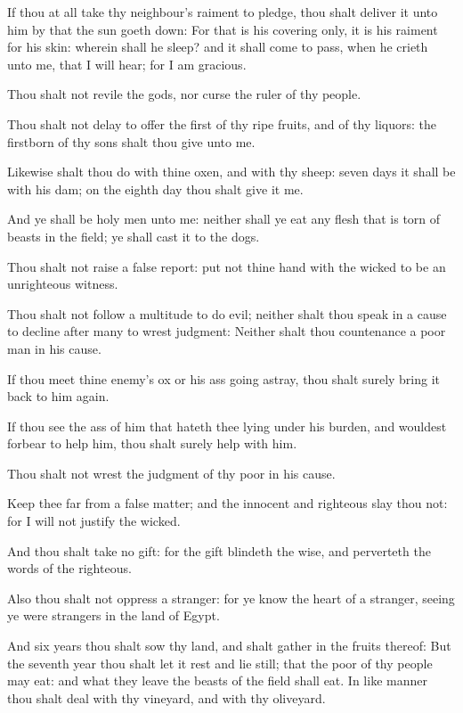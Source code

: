 \Verse If thou at all take thy neighbour's raiment to pledge, thou shalt deliver it unto him by that the sun goeth down: \Verse For that is his covering only, it is his raiment for his skin: wherein shall he sleep? and it shall come to pass, when he crieth unto me, that I will hear; for I am gracious.

\Verse Thou shalt not revile the gods, nor curse the ruler of thy people.

\Verse Thou shalt not delay to offer the first of thy ripe fruits, and of thy liquors: the firstborn of thy sons shalt thou give unto me.

\Verse Likewise shalt thou do with thine oxen, and with thy sheep: seven days it shall be with his dam; on the eighth day thou shalt give it me.

\Verse And ye shall be holy men unto me: neither shall ye eat any flesh that is torn of beasts in the field; ye shall cast it to the dogs.

\Chapter
\Verse Thou shalt not raise a false report: put not thine hand with the wicked to be an unrighteous witness.

\Verse Thou shalt not follow a multitude to do evil; neither shalt thou speak in a cause to decline after many to wrest judgment: \Verse Neither shalt thou countenance a poor man in his cause.

\Verse If thou meet thine enemy's ox or his ass going astray, thou shalt surely bring it back to him again.

\Verse If thou see the ass of him that hateth thee lying under his burden, and wouldest forbear to help him, thou shalt surely help with him.

\Verse Thou shalt not wrest the judgment of thy poor in his cause.

\Verse Keep thee far from a false matter; and the innocent and righteous slay thou not: for I will not justify the wicked.

\Verse And thou shalt take no gift: for the gift blindeth the wise, and perverteth the words of the righteous.

\Verse Also thou shalt not oppress a stranger: for ye know the heart of a stranger, seeing ye were strangers in the land of Egypt.

\Verse And six years thou shalt sow thy land, and shalt gather in the fruits thereof: \Verse But the seventh year thou shalt let it rest and lie still; that the poor of thy people may eat: and what they leave the beasts of the field shall eat. In like manner thou shalt deal with thy vineyard, and with thy oliveyard.

